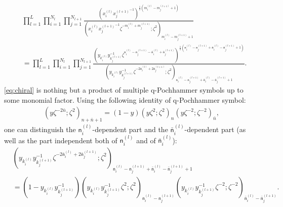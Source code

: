 \documentclass[a4paper,11pt]{article}
\begin{document}
\begin{align}
\label{eq:chiral}
%
& \prod_{l = 1}^L \prod_{i = 1}^{N_l} \prod_{j = 1}^{N_{l+1}} \frac{\left(x^{(l)}_i {x^{(l+1)}_j}^{-1}\right)^{\frac{1}{2} (m^{(l)}_i-m^{(l+1)}_j+1)}}{\left(x^{(l)}_i {x^{(l+1)}_j}^{-1} \zeta^{-m^{(l)}_i+m^{(l+1)}_j};\zeta^2\right)_{m^{(l)}_i-m^{(l+1)}_j+1}} \nonumber \\
%
%
&= \prod_{l = 1}^L \prod_{i = 1}^{N_l} \prod_{j = 1}^{N_{l+1}} \frac{\left(y_{k^{(l)}_i} y_{k^{(l+1)}_j}^{-1} \zeta^{\mathsf n^{(l)}_i-\mathsf n^{(l+1)}_j-\mathsf{\bar n}^{(l)}_i+\mathsf{\bar n}^{(l+1)}_j}\right)^{\frac{1}{2} (\mathsf n^{(l)}_i-\mathsf n^{(l+1)}_j+\mathsf{\bar n}^{(l)}_i-\mathsf{\bar n}^{(l+1)}_j+1)}}{\left(y_{k^{(l)}_i} y_{k^{(l+1)}_j}^{-1} \zeta^{-2 \mathsf{\bar n}^{(l)}_i+2 \mathsf{\bar n}^{(l+1)}_j};\zeta^2\right)_{\mathsf n^{(l)}_i-\mathsf n^{(l+1)}_j+\mathsf{\bar n}^{(l)}_i-\mathsf{\bar n}^{(l+1)}_j+1}}.
%
\end{align}
\eqref{eq:chiral} is nothing but a product of multiple q-Pochhammer symbols up to some monomial factor. Using the following identity of q-Pochhammer symbol:
\begin{align}
\label{eq:q-Pochh ident}
\left(y \zeta^{-2 \bar n};\zeta^2\right)_{n+\bar n+1} = (1-y) \left(y \zeta^2;\zeta^2\right)_n \left(y \zeta^{-2};\zeta^{-2}\right)_{\bar n},
\end{align}
one can distinguish the $\mathsf n^{(l)}_i$-dependent part and the $\mathsf{\bar n}^{(l)}_i$-dependent part (as well as the part independent both of $\mathsf n^{(l)}_i$ and of $\mathsf{\bar n}^{(l)}_i$):
\begin{align}
%
& \left(y_{k^{(l)}_i} y_{k^{(l+1)}_j}^{-1} \zeta^{-2 \mathsf{\bar n}^{(l)}_i+2 \mathsf{\bar n}^{(l+1)}_j};\zeta^2\right)_{\mathsf n^{(l)}_i-\mathsf n^{(l+1)}_j+\mathsf{\bar n}^{(l)}_i-\mathsf{\bar n}^{(l+1)}_j+1} \nonumber \\
%
&= \left(1-y_{k^{(l)}_i} y_{k^{(l+1)}_j}^{-1}\right) \left(y_{k^{(l)}_i} y_{k^{(l+1)}_j}^{-1} \zeta^2;\zeta^2\right)_{\mathsf n^{(l)}_i-\mathsf n^{(l+1)}_j} \left(y_{k^{(l)}_i} y_{k^{(l+1)}_j}^{-1} \zeta^{-2};\zeta^{-2}\right)_{\mathsf{\bar n}^{(l)}_i-\mathsf{\bar n}^{(l+1)}_j}.
%
\end{align}
\end{document}
